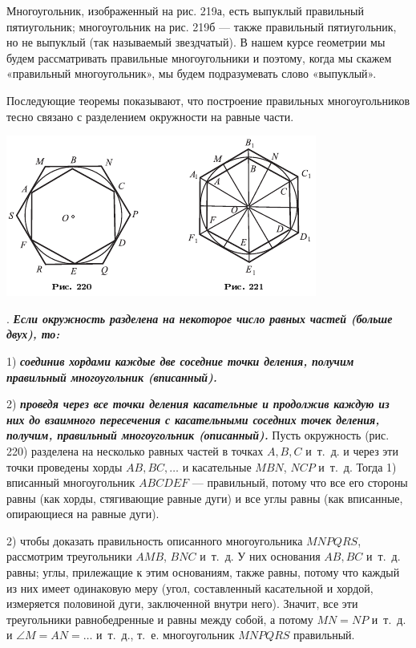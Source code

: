 \documentclass[oneside]{book}
\begin{document}
Многоугольник, изображенный на рис. 219а, есть выпуклый правильный пятиугольник;
многоугольник на рис. 219б — также правильный пятиугольник, но не выпуклый (так называемый звездчатый).
В нашем курсе геометрии мы будем рассматривать  правильные многоугольники и поэтому, когда мы скажем «правильный многоугольник», мы будем подразумевать слово «выпуклый».

Последующие теоремы показывают, что построение правильных многоугольников тесно связано с разделением окружности на равные части.

\includegraphics{pics/ris-220-221}

.
\textbf{\emph{Если окружность разделена на некоторое число равных частей (больше двух), то:}}

1) \textbf{\emph{соединив хордами каждые две соседние точки деления, получим правильный многоугольник (вписанный).}}

2) \textbf{\emph{проведя через все точки деления касательные и продолжив каждую из них до взаимного пересечения с касательными соседних точек деления, получим, правильный многоугольник (описанный).}}
Пусть окружность (рис. 220) разделена на несколько равных частей в точках $A, B, C$ и~т.~д.
и через эти точки проведены хорды $AB, BC,\dots$
и касательные $MBN$, $NCP$ и~т.~д.
Тогда 1) вписанный многоугольник $ABCDEF$ — правильный, потому что все его стороны равны (как хорды, стягивающие равные дуги) и все углы равны (как вписанные, опирающиеся на равные дуги).

2) чтобы доказать правильность описанного многоугольника $MNPQRS$, рассмотрим треугольники $AMB$, $BNC$ и~т.~д.
У них основания $AB, BC$ и~т.~д.
равны;
углы, прилежащие к этим основаниям, также равны, потому что каждый из них имеет одинаковую меру (угол, составленный касательной и хордой, измеряется половиной дуги, заключенной внутри него).
Значит, все эти треугольники равнобедренные и равны между собой, а потому $MN=NP$ и~т.~д.
и $\angle M=AN=\dots$
и~т.~д., т.~е. многоугольник $MNPQRS$ правильный.
\end{document}
